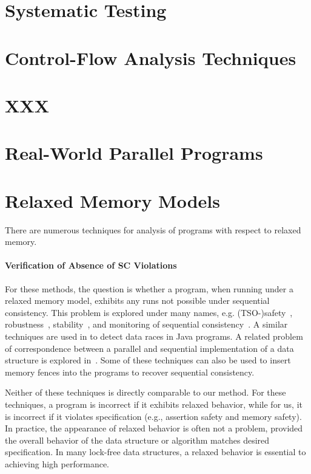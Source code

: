 \section{Systematic Testing}

\section{Control-Flow Analysis Techniques}

\section{XXX}

\section{Real-World Parallel Programs}


\section{Relaxed Memory Models}

There are numerous techniques for analysis of programs with respect to relaxed memory.

\paragraph{Verification of Absence of SC Violations}

For these methods, the question is whether a program, when running under a relaxed memory model, exhibits any runs not possible under sequential consistency.
This problem is explored under many names, e.g. (TSO-)safety~\cite{Burckhardt2008}, robustness~\cite{Bouajjani2013,Derevenetc2014}, stability~\cite{Alglave2011}, and monitoring of sequential consistency~\cite{Burnim2011}.
A similar techniques are used in \cite{Yang2004} to detect data races in Java programs.
A related problem of correspondence between a parallel and sequential implementation of a data structure is explored in~\cite{Ou2017}.
Some of these techniques can also be used to insert memory fences into the programs to recover sequential consistency.

Neither of these techniques is directly comparable to our method.
For these techniques, a program is incorrect if it exhibits relaxed behavior, while for us, it is incorrect if it violates specification (e.g., assertion safety and memory safety).
In practice, the appearance of relaxed behavior is often not a problem, provided the overall behavior of the data structure or algorithm matches desired specification.
In many lock-free data structures, a relaxed behavior is essential to achieving high performance.

